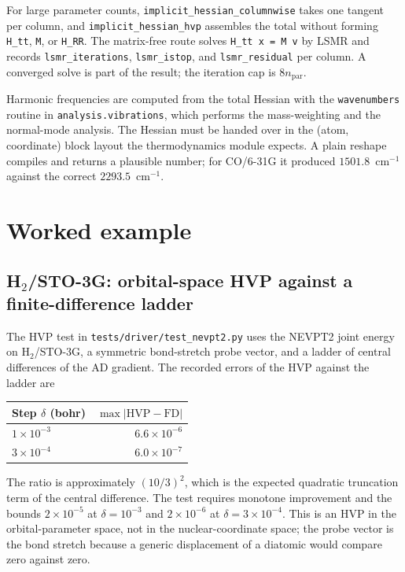 For large parameter counts, \texttt{implicit\_hessian\_columnwise}
takes one tangent per column, and \texttt{implicit\_hessian\_hvp}
assembles the total without forming \texttt{H\_tt}, \texttt{M}, or
\texttt{H\_RR}.  The matrix-free route solves
\texttt{H\_tt x = M v} by LSMR and records \texttt{lsmr\_iterations},
\texttt{lsmr\_istop}, and \texttt{lsmr\_residual} per column.  A
converged solve is part of the result; the iteration cap is
$8n_{\mathrm{par}}$.

Harmonic frequencies are computed from the total Hessian with the
\texttt{wavenumbers} routine in \texttt{analysis.vibrations}, which
performs the mass-weighting and the normal-mode analysis.  The Hessian must be
handed over in the (atom, coordinate) block layout the thermodynamics
module expects.  A plain reshape compiles and returns a plausible
number; for CO/6-31G it produced $1501.8$~cm$^{-1}$ against the correct
$2293.5$~cm$^{-1}$.

\section{Worked example}
\label{sec:hessian-example}

\subsection{H\texorpdfstring{$_2$}{2}/STO-3G: orbital-space HVP against
a finite-difference ladder}

The HVP test in \texttt{tests/driver/test\_nevpt2.py} uses the
NEVPT2 joint energy on H$_2$/STO-3G, a symmetric bond-stretch probe
vector, and a ladder of central differences of the AD gradient.  The
recorded errors of the HVP against the ladder are
\begin{center}
\small
\begin{tabular}{lr}
\toprule
Step $\delta$ (bohr) & $\max|\mathrm{HVP}-\mathrm{FD}|$ \\
\midrule
$1\times10^{-3}$ & $6.6\times10^{-6}$ \\
$3\times10^{-4}$ & $6.0\times10^{-7}$ \\
\bottomrule
\end{tabular}
\end{center}
The ratio is approximately $(10/3)^2$, which is the expected quadratic
truncation term of the central difference.  The test requires monotone
improvement and the bounds $2\times10^{-5}$ at $\delta=10^{-3}$ and
$2\times10^{-6}$ at $\delta=3\times10^{-4}$.  This is an HVP in the
orbital-parameter space, not in the nuclear-coordinate space; the
probe vector is the bond stretch because a generic displacement of a
diatomic would compare zero against zero.


